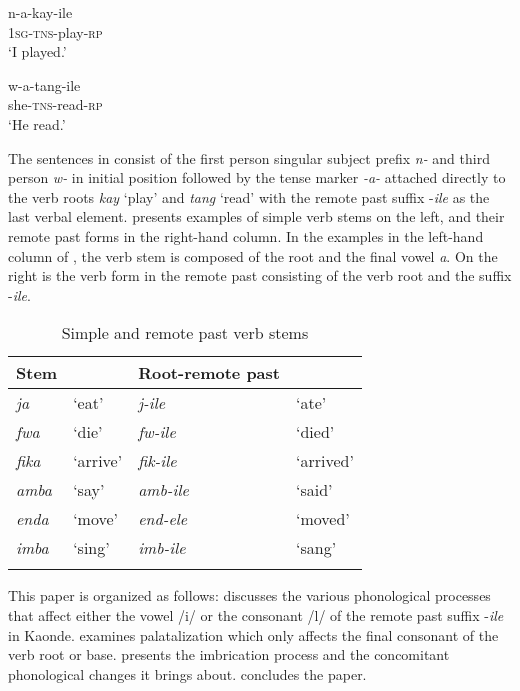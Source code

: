 \documentclass[output=paper]{langsci/langscibook}
\begin{document}
\ea
\label{ex:1.kawasha}
	\ea\label{ex:1a.kawasha}
\gll n-a-kay-ile \\
	\textsc{1sg-tns}-play-\textsc{rp} \\
\glt `I played.'

	\ex\label{ex:1b.kawasha}
\gll w-a-tang-ile \\
	she-\textsc{tns}-read-\textsc{rp} \\
\glt `He read.'
	\z
\z 



The sentences in  consist of the first person singular subject prefix \textit{n-} and third person \textit{w-} in initial position followed by the tense marker \textit{-a-} attached directly to the verb roots \textit{kay} ‘play’ and \textit{tang} ‘read’ with the remote past suffix -\textit{ile} as the last verbal element.  presents examples of simple verb stems on the left, and their remote past forms in the right-hand column. In the examples in the left-hand column of , the verb stem is composed of the root and the final vowel \textit{a}. On the right is the verb form in the remote past consisting of the verb root and the suffix -\textit{ile}.


\begin{table}
\begin{tabularx}{\textwidth}{XXXX}
\lsptoprule
  Stem &  &   Root-remote past & \\
\midrule
\textit{ja } & `eat' & \textit{j-ile} & `ate' \\
\textit{fwa} & `die' & \textit{fw-ile} & `died' \\
\textit{fika} & `arrive' & \textit{fik-ile} & `arrived' \\
\textit{amba} & `say' & \textit{amb-ile} & `said' \\
\textit{enda} & `move' & \textit{end-ele} & `moved' \\
\textit{imba} & `sing' & \textit{imb-ile} & `sang' \\

\lspbottomrule
\end{tabularx}

\caption{Simple and remote past verb stems}
\label{tab:1.kawasha}

 \end{table}


This paper is organized as follows:  discusses the various phonological processes that affect either the vowel /i/ or the consonant /l/ of the remote past suffix -\textit{ile} in Kaonde.  examines palatalization which only affects the final consonant of the verb root or base.  presents the imbrication process and the concomitant phonological changes it brings about.  concludes the paper.
\end{document}

